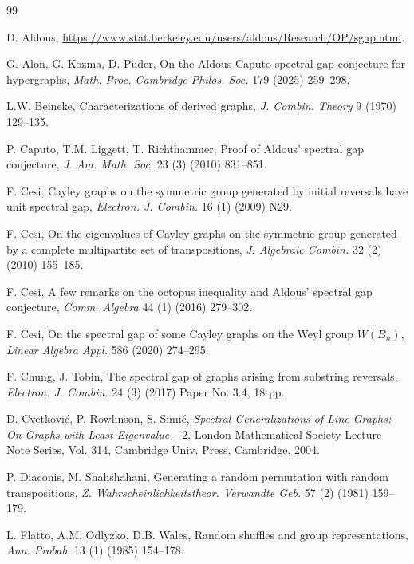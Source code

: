 \documentclass[12pt, a4paper]{article}
\theoremstyle{definition}
\begin{document}
\begin{thebibliography}{99}
	
D. Aldous, \url{https://www.stat.berkeley.edu/users/aldous/Research/OP/sgap.html}.
	




G. Alon, G. Kozma, D. Puder, On the Aldous-Caputo spectral gap conjecture for hypergraphs, {\em Math. Proc. Cambridge Philos. Soc.} 179 (2025) 259--298. 

L.W. Beineke, Characterizations of derived graphs, {\em J. Combin. Theory} 9 (1970) 129--135.



P. Caputo, T.M. Liggett, T. Richthammer, Proof of Aldous' spectral gap conjecture, {\em J. Am. Math. Soc.} 23 (3) (2010) 831--851.

F. Cesi, Cayley graphs on the symmetric group generated by initial reversals have unit spectral gap, {\em Electron. J. Combin.} 16 (1) (2009) N29.

F. Cesi, On the eigenvalues of Cayley graphs on the symmetric group generated by a complete multipartite set of transpositions, {\em J. Algebraic Combin.} 32 (2) (2010) 155--185.

F. Cesi, A few remarks on the octopus inequality and Aldous' spectral gap conjecture, {\em Comm. Algebra} 44 (1) (2016) 279--302.

F. Cesi, On the spectral gap of some Cayley graphs on the Weyl group $W(B_n)$, {\em Linear Algebra Appl.} 586 (2020) 274--295.

F. Chung, J. Tobin, The spectral gap of graphs arising from substring reversals, {\em Electron. J. Combin.} 24 (3) (2017) Paper No. 3.4, 18 pp.

D. Cvetkovi\'{c}, P. Rowlinson, S. Simi\'{c}, {\em Spectral Generalizations of Line Graphs: On Graphs with Least Eigenvalue $-2$}, London Mathematical Society Lecture Note Series, Vol. 314, Cambridge Univ. Press, Cambridge, 2004.



P. Diaconis, M. Shahshahani, Generating a random permutation with random transpositions, {\em Z. Wahrscheinlichkeitstheor. Verwandte Geb.} 57 (2) (1981) 159--179.



L. Flatto, A.M. Odlyzko, D.B. Wales, Random shuffles and group representations, {\em Ann. Probab.} 13 (1) (1985) 154--178.


\end{thebibliography}
\end{document}

